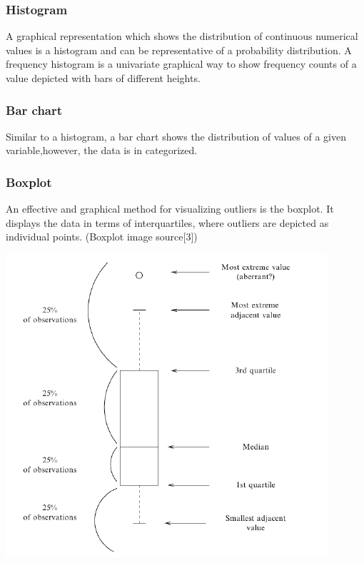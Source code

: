 \documentclass[]{article}
\begin{document}
\subsubsection{Histogram}\label{histogram}

A graphical representation which shows the distribution of continuous
numerical values is a histogram and can be representative of a
probability distribution. A frequency histogram is a univariate
graphical way to show frequency counts of a value depicted with bars of
different heights.

\subsubsection{Bar chart}\label{bar-chart}

Similar to a histogram, a bar chart shows the distribution of values of
a given variable,however, the data is in categorized.

\subsubsection{Boxplot}\label{boxplot}

An effective and graphical method for visualizing outliers is the
boxplot. It displays the data in terms of interquartiles, where outliers
are depicted as individual points. (Boxplot image source{[}3{]})

\begin{center}\includegraphics{edaReport_files/figure-latex/unnamed-chunk-2-1} \end{center}
\end{document}
